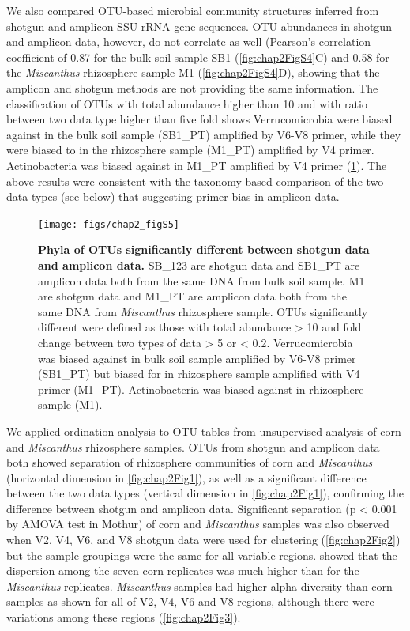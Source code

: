 \documentclass[]{msu-thesis}
\begin{document}
We also compared OTU-based microbial community structures inferred from shotgun and amplicon SSU rRNA gene sequences. OTU abundances in shotgun and amplicon data, however, do not correlate as well (Pearson’s correlation coefficient of 0.87 for the bulk soil sample SB1 (\cref{fig:chap2FigS4}C) and 0.58 for the \textit{Miscanthus} rhizosphere sample M1 (\cref{fig:chap2FigS4}D), showing that the amplicon and shotgun methods are not providing the same information. The classification of OTUs with total abundance higher than 10 and with ratio between two data type higher than five fold shows Verrucomicrobia were biased against in the bulk soil sample (SB1\_PT) amplified by V6-V8 primer, while they were biased to in the rhizosphere sample (M1\_PT) amplified by V4 primer. Actinobacteria was biased against in M1\_PT amplified by V4 primer (\cref{fig:chap2FigS5}).  The above results were consistent with the taxonomy-based comparison of the two data types (see below) that suggesting primer bias in amplicon data.


\begin{figure}[tbph!]
  \centering
  \texttt{[image: figs/chap2\_figS5]}
  \caption[Phyla of OTUs significantly different between shotgun data and amplicon data]{\textbf{Phyla of OTUs significantly different between shotgun data and amplicon data.} SB\_123 are shotgun data and SB1\_PT are amplicon data both from the same DNA from bulk soil sample. M1 are shotgun data and M1\_PT are amplicon data both from the same DNA from \textit{Miscanthus} rhizosphere sample. OTUs significantly different were defined as those with total abundance > 10 and fold change between two types of data > 5 or < 0.2. Verrucomicrobia was biased against in bulk soil sample amplified by V6-V8 primer (SB1\_PT) but biased for in rhizosphere sample amplified with V4 primer (M1\_PT). Actinobacteria was biased against in rhizosphere sample (M1).}
  \label{fig:chap2FigS5}
\end{figure}


We applied ordination analysis to OTU tables from unsupervised analysis of corn and \textit{Miscanthus} rhizosphere samples. OTUs from shotgun and amplicon data both showed separation of rhizosphere communities of corn and \textit{Miscanthus} (horizontal dimension in \cref{fig:chap2Fig1}), as well as a significant difference between the two data types (vertical dimension in \cref{fig:chap2Fig1}), confirming the difference between shotgun and amplicon data. Significant separation (p < 0.001 by AMOVA test in Mothur) of corn and \textit{Miscanthus} samples was also observed when V2, V4, V6, and V8 shotgun data were used for clustering (\cref{fig:chap2Fig2}) but the sample groupings were the same for all variable regions.  showed that the dispersion among the seven corn replicates was much higher than for the \textit{Miscanthus} replicates. \textit{Miscanthus} samples had higher alpha diversity than corn samples as shown for all of V2, V4, V6 and V8 regions, although there were variations among these regions (\cref{fig:chap2Fig3}).
\end{document}
